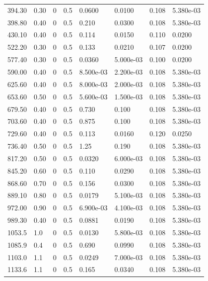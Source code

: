 \documentclass[preview]{standalone}
\begin{document}
{{\begin{tabular}{L{1.2cm}C{1.2cm} C{0.3cm}C{0.5cm} C{1.4cm}C{1.4cm} C{1.4cm}C{1.4cm}}
  394.30  &  0.30  & 0     & 0.5 &  0.0600  & 0.0100  & 0.108 &  5.380e-03   \\ 
  398.80  &  0.40  & 0     & 0.5 &  0.210  & 0.0300  & 0.108 &  5.380e-03   \\ 
  430.10  &  0.40  & 0     & 0.5 &  0.114  & 0.0150  & 0.110 &  0.0200   \\ 
  522.20  &  0.30  & 0     & 0.5 &  0.133  & 0.0210  & 0.107 &  0.0200   \\ 
  577.40  &  0.30  & 0     & 0.5 &  0.0360  & 5.000e-03  & 0.100 &  0.0200   \\ 
  590.00  &  0.40  & 0     & 0.5 &  8.500e-03  & 2.200e-03  & 0.108 &  5.380e-03   \\ 
  625.60  &  0.40  & 0     & 0.5 &  8.000e-03  & 2.000e-03  & 0.108 &  5.380e-03   \\ 
  653.60  &  0.50  & 0     & 0.5 &  5.600e-03  & 1.500e-03  & 0.108 &  5.380e-03   \\ 
  679.50  &  0.40  & 0     & 0.5 &  0.730  & 0.100  & 0.108 &  5.380e-03   \\ 
  703.60  &  0.40  & 0     & 0.5 &  0.875  & 0.100  & 0.108 &  5.380e-03   \\ 
  729.60  &  0.40  & 0     & 0.5 &  0.113  & 0.0160  & 0.120 &  0.0250   \\ 
  736.40  &  0.50  & 0     & 0.5 &  1.25  & 0.190  & 0.108 &  5.380e-03   \\ 
  817.20  &  0.50  & 0     & 0.5 &  0.0320  & 6.000e-03  & 0.108 &  5.380e-03   \\ 
  845.20  &  0.60  & 0     & 0.5 &  0.110  & 0.0290  & 0.108 &  5.380e-03   \\ 
  868.60  &  0.70  & 0     & 0.5 &  0.156  & 0.0300  & 0.108 &  5.380e-03   \\ 
  889.10  &  0.80  & 0     & 0.5 &  0.0179  & 5.100e-03  & 0.108 &  5.380e-03   \\ 
  972.00  &  0.90  & 0     & 0.5 &  6.900e-03  & 4.100e-03  & 0.108 &  5.380e-03   \\ 
  989.30  &  0.40  & 0     & 0.5 &  0.0881  & 0.0190  & 0.108 &  5.380e-03   \\ 
  1053.5  &   1.0  & 0     & 0.5 &  0.0130  & 5.800e-03  & 0.108 &  5.380e-03   \\ 
  1085.9  &   0.4  & 0     & 0.5 &  0.690  & 0.0990  & 0.108 &  5.380e-03   \\ 
  1103.0  &   1.1  & 0     & 0.5 &  0.0249  & 7.000e-03  & 0.108 &  5.380e-03   \\ 
  1133.6  &   1.1  & 0     & 0.5 &  0.165  & 0.0340  & 0.108 &  5.380e-03   \\ 

\end{tabular}}}
\end{document}
